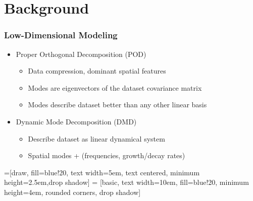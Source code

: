 \documentclass[9pt]{beamer}
\begin{document}
\section{Background}
\label{sec-2}
\begin{frame}
\frametitle{Low-Dimensional Modeling}
\label{sec-2-1}

\begin{itemize}
\item Proper Orthogonal Decomposition (POD)
\begin{itemize}
\item Data compression, dominant spatial features
\item Modes are eigenvectors of the dataset covariance matrix
\item Modes describe dataset better than any other linear basis
\end{itemize}
\item Dynamic Mode Decomposition (DMD)
\begin{itemize}
\item Describe dataset as linear dynamical system
\item Spatial modes + (frequencies, growth/decay rates)
\end{itemize}
\end{itemize}



\fontsize{9}\selectfont


=[draw, fill=blue!20, text width=5em, 
    text centered, minimum height=2.5em,drop shadow]
 = [basic, text width=10em, fill=blue!20, 
    minimum height=4em, rounded corners, drop shadow]


\end{frame}
\end{document}
